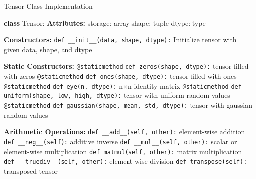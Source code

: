 \documentclass{article}
\begin{document}
  \begin{algorithm}[H]
    \caption{Tensor Class Implementation}
    \begin{algorithmic}[1]
    \State \textbf{class} Tensor:
        \State \textbf{Attributes:}
        \State \hspace{1em}storage: array  
        \State \hspace{1em}shape: tuple    
        \State \hspace{1em}dtype: type     

        \State \textbf{Constructors:}
        \State \texttt{def \_\_init\_\_(data, shape, dtype):}
            \State \hspace{2em}Initialize tensor with given data, shape, and dtype

        \State \textbf{Static Constructors:}
        \State \texttt{@staticmethod}
        \State \texttt{def zeros(shape, dtype):}
            \State \hspace{2em}\Return tensor filled with zeros
        \State \texttt{@staticmethod}
        \State \texttt{def ones(shape, dtype):}
            \State \hspace{2em}\Return tensor filled with ones
        \State \texttt{@staticmethod}
        \State \texttt{def eye(n, dtype):}
            \State \hspace{2em}\Return n×n identity matrix
        \State \texttt{@staticmethod}
        \State \texttt{def uniform(shape, low, high, dtype):}
            \State \hspace{2em}\Return tensor with uniform random values
        \State \texttt{@staticmethod}
        \State \texttt{def gaussian(shape, mean, std, dtype):}
            \State \hspace{2em}\Return tensor with gaussian random values

        \State \textbf{Arithmetic Operations:}
        \State \texttt{def \_\_add\_\_(self, other):}
            \State \hspace{2em}\Return element-wise addition
        \State \texttt{def \_\_neg\_\_(self):}
            \State \hspace{2em}\Return additive inverse
        \State \texttt{def \_\_mul\_\_(self, other):}
            \State \hspace{2em}\Return scalar or element-wise multiplication
        \State \texttt{def matmul(self, other):}
            \State \hspace{2em}\Return matrix multiplication
        \State \texttt{def \_\_truediv\_\_(self, other):}
            \State \hspace{2em}\Return element-wise division
        \State \texttt{def transpose(self):}
            \State \hspace{2em}\Return transposed tensor


\end{algorithmic}
\end{algorithm}
\end{document}
